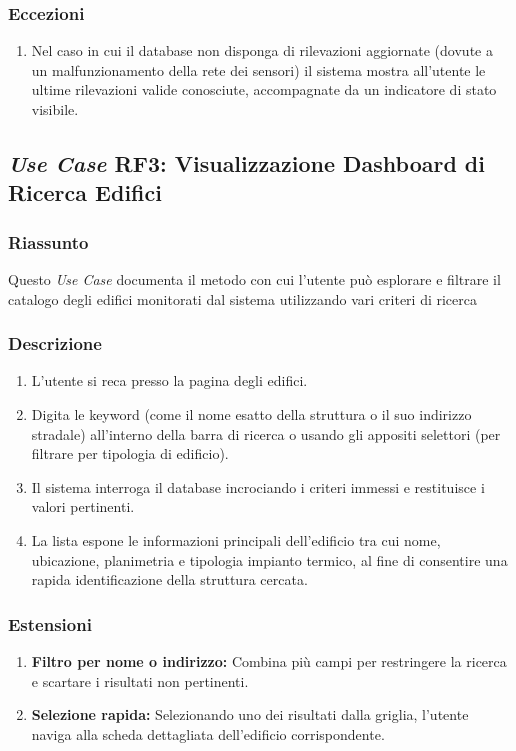         \subsubsection*{Eccezioni}
            \begin{enumerate}
                \item Nel caso in cui il database non disponga di rilevazioni aggiornate (dovute a un malfunzionamento della rete dei sensori) il sistema mostra all'utente le ultime rilevazioni valide conosciute, accompagnate da un indicatore di stato visibile.
            \end{enumerate}

    \subsection*{\textit{Use Case} RF3: Visualizzazione Dashboard di Ricerca Edifici}
        \subsubsection*{Riassunto}
            Questo \textit{Use Case} documenta il metodo con cui l'utente può esplorare e filtrare il catalogo degli edifici monitorati dal sistema utilizzando vari criteri di ricerca
        \subsubsection*{Descrizione}
            \begin{enumerate}
                \item L'utente si reca presso la pagina degli edifici.
                \item Digita le keyword (come il nome esatto della struttura o il suo indirizzo stradale) all'interno della barra di ricerca o usando gli appositi selettori (per filtrare per tipologia di edificio).
                \item Il sistema interroga il database incrociando i criteri immessi e restituisce i valori pertinenti.
                \item La lista espone le informazioni principali dell'edificio tra cui nome, ubicazione, planimetria e tipologia impianto termico, al fine di consentire una rapida identificazione della struttura cercata.
            \end{enumerate}
        \subsubsection*{Estensioni}
            \begin{enumerate}
                \item \textbf{ Filtro per nome o indirizzo: } Combina più campi per restringere la ricerca e scartare i risultati non pertinenti.
                \item \textbf{Selezione rapida:} Selezionando uno dei risultati dalla griglia, l'utente naviga alla scheda dettagliata dell'edificio corrispondente.
            \end{enumerate}
